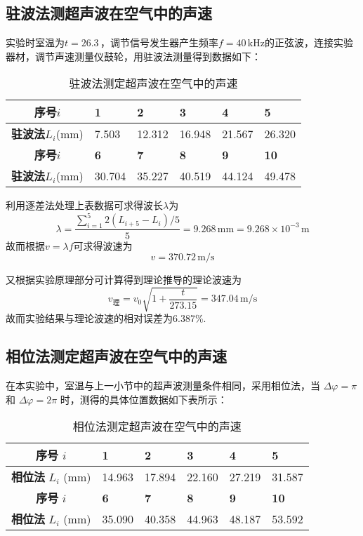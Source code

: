 \documentclass[UTF-8,twoside,cs4size]{ctexart}
\begin{document}
\subsection{驻波法测超声波在空气中的声速}
	实验时室温为$ t=26.3 $\,\textcelsius，调节信号发生器产生频率$ f=40\,\mathrm{kHz} $的正弦波，连接实验器材，调节声速测量仪鼓轮，用驻波法测量得到数据如下：
	\begin{table}[!h]
		\centering
		\renewcommand\arraystretch{1.4}
		\captionsetup{skip=0pt}
		\caption{驻波法测定超声波在空气中的声速}
		\begin{tabularx}{\textwidth}{|c|Y|Y|Y|Y|Y|}
			\hline
			\textbf{序号}$ i $&\textbf{1}&\textbf{2}&\textbf{3}&\textbf{4}&\textbf{5}\\
			\hline
			\textbf{驻波法}$ L_i $(mm)&7.503&12.312&16.948&21.567&26.320\\
			\hline
			\textbf{序号}$ i $&\textbf{6}&\textbf{7}&\textbf{8}&\textbf{9}&\textbf{10}\\
			\hline
			\textbf{驻波法}$ L_i $(mm)&30.704&35.227&40.519&44.124&49.478\\
			\hline
		\end{tabularx}
	\end{table}

    利用逐差法处理上表数据可求得波长$ \lambda $为
	\[\lambda=\frac{\sum_{i=1}^{5}2(L_{i+5}-L_i)/5}{5}=9.268\,\mathrm{mm}=9.268\times10^{-3}\,\mathrm{m}\]
	故而根据$ v=\lambda f $可求得波速为
	\[v=370.72\,\mathrm{m/s}\]
	
	又根据实验原理部分可计算得到理论推导的理论波速为
	\[v_{\text{理}}=v_0\sqrt{1+\frac{t}{273.15}}=347.04\,\mathrm{m/s}\]
	故而实验结果与理论波速的相对误差为6.387\%.

    \subsection{相位法测定超声波在空气中的声速}

    在本实验中，室温与上一小节中的超声波测量条件相同，采用相位法，当 $\Delta \varphi = \pi$ 和 $\Delta \varphi = 2\pi$ 时，测得的具体位置数据如下表所示：
    
    \begin{table}[!h]
        \centering
        \renewcommand\arraystretch{1.4}
        \captionsetup{skip=0pt}
        \caption{相位法测定超声波在空气中的声速}
        \begin{tabularx}{\textwidth}{|c|Y|Y|Y|Y|Y|}
            \hline
            \textbf{序号} $i$ & \textbf{1} & \textbf{2} & \textbf{3} & \textbf{4} & \textbf{5} \\
            \hline
            \textbf{相位法} $L_i$ (mm) & 14.963 & 17.894 & 22.160 & 27.219 & 31.587 \\
            \hline
            \textbf{序号} $i$ & \textbf{6} & \textbf{7} & \textbf{8} & \textbf{9} & \textbf{10} \\
            \hline
            \textbf{相位法} $L_i$ (mm) & 35.090 & 40.358 & 44.963 & 48.187 & 53.592 \\
            \hline
        \end{tabularx}
    \end{table}
    
\end{document}
